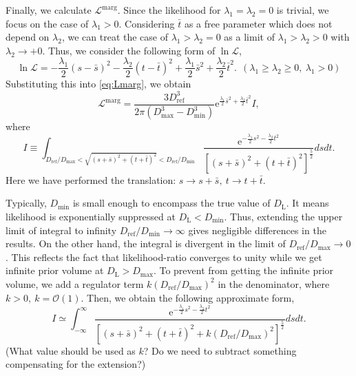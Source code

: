 \documentclass[12pt]{article}
\renewcommand{\L}{\mathcal{L}}
\newcommand{\Lmarg}{\mathcal{L}^{\mathrm{marg}}}
\newcommand{\Dref}{D_{\mathrm{ref}}}
\newcommand{\DL}{D_{\mathrm{L}}}
\newcommand{\Dmin}{D_{\mathrm{min}}}
\newcommand{\Dmax}{D_{\mathrm{max}}}
\newcommand{\e}{\mathrm{e}}
\begin{document}
Finally, we calculate $\Lmarg$.
Since the likelihood for $\lambda_1=\lambda_2=0$ is trivial, we focus on the case of $\lambda_1>0$. 
Considering $\bar{t}$ as a free parameter which does not depend on $\lambda_2$, we can treat the case of $\lambda_1>\lambda_2=0$ as a limit of $\lambda_1>\lambda_2>0$ with $\lambda_2 \to +0$.
Thus, we consider the following form of $\ln \L$,
\begin{equation}
\ln \L = - \frac{\lambda_1}{2} (s - \bar{s})^2 - \frac{\lambda_2}{2} (t - \bar{t})^2 + \frac{\lambda_1}{2} \bar{s}^2 + \frac{\lambda_2}{2} \bar{t}^2.~~(\lambda_1 \geq \lambda_2 \geq 0,~\lambda_1>0)
\end{equation}
Substituting this into \eqref{eq:Lmarg}, we obtain
\begin{equation}
\Lmarg = \frac{3 \Dref^3}{2 \pi (\Dmax^3 - \Dmin^3)} \e^{\frac{\lambda_1}{2} \bar{s}^2 + \frac{\lambda_2}{2} \bar{t}^2} I, 
\end{equation}
where
\begin{equation}
I \equiv \int_{\Dref / \Dmax < \sqrt{(s+\bar{s})^2 + (t+\bar{t})^2} < \Dref / \Dmin} \frac{\e^{-\frac{\lambda_1}{2} s^2 - \frac{\lambda_2}{2} t^2}}{\left[(s+\bar{s})^2 + (t+\bar{t})^2 \right]^{\frac{5}{2}}} ds dt.
\end{equation}
Here we have performed the translation: $s \to s + \bar{s},~t \to t + \bar{t}$.

Typically, $\Dmin$ is small enough to encompass the true value of $\DL$.
It means likelihood is exponentially suppressed at $\DL < \Dmin$. 
Thus, extending the upper limit of integral to infinity $\Dref / \Dmin \to \infty$ gives negligible differences in the results.
On the other hand, the integral is divergent in the limit of $\Dref / \Dmax \to 0$.
This reflects the fact that likelihood-ratio converges to unity while we get infinite prior volume at $\DL > \Dmax$.
To prevent from getting the infinite prior volume, we add a regulator term $k (\Dref / \Dmax)^2$ in the denominator, where $k>0,~k=\mathcal{O}(1)$.
Then, we obtain the following approximate form,
\begin{equation}
I \simeq \int_{-\infty}^\infty \frac{\e^{-\frac{\lambda_1}{2} s^2 - \frac{\lambda_2}{2} t^2}}{\left[(s+\bar{s})^2 + (t+\bar{t})^2 + k (\Dref / \Dmax)^2 \right]^{\frac{5}{2}}} ds dt.
\end{equation}
{\color{red} (What value should be used as $k$? Do we need to subtract something compensating for the extension?)}
\end{document}
